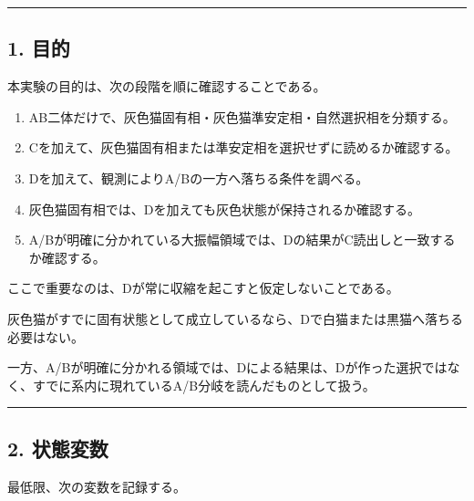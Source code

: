 \documentclass{article}
\providecommand{\tightlist}{\setlength{\itemsep}{0pt}\setlength{\parskip}{0pt}}
\begin{document}
\begin{center}\rule{0.5\linewidth}{0.5pt}\end{center}

\subsection{1. 目的}\label{ux76eeux7684}

本実験の目的は、次の段階を順に確認することである。

\begin{enumerate}
\def\labelenumi{\arabic{enumi}.}
\tightlist
\item
  AB二体だけで、灰色猫固有相・灰色猫準安定相・自然選択相を分類する。
\item
  Cを加えて、灰色猫固有相または準安定相を選択せずに読めるか確認する。
\item
  Dを加えて、観測によりA/Bの一方へ落ちる条件を調べる。
\item
  灰色猫固有相では、Dを加えても灰色状態が保持されるか確認する。
\item
  A/Bが明確に分かれている大振幅領域では、Dの結果がC読出しと一致するか確認する。
\end{enumerate}

ここで重要なのは、Dが常に収縮を起こすと仮定しないことである。

灰色猫がすでに固有状態として成立しているなら、Dで白猫または黒猫へ落ちる必要はない。

一方、A/Bが明確に分かれる領域では、Dによる結果は、Dが作った選択ではなく、すでに系内に現れているA/B分岐を読んだものとして扱う。

\begin{center}\rule{0.5\linewidth}{0.5pt}\end{center}

\subsection{2. 状態変数}\label{ux72b6ux614bux5909ux6570}

最低限、次の変数を記録する。
\end{document}
